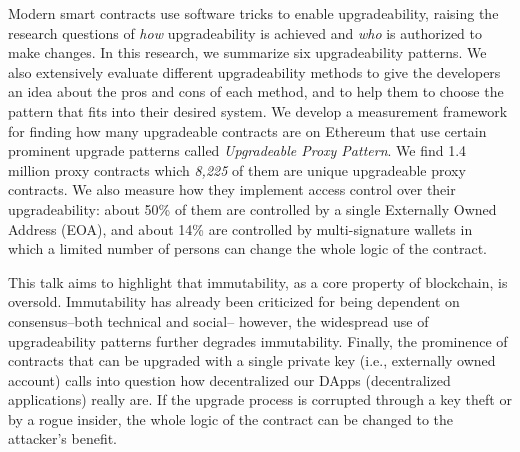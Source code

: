 \documentclass[a4paper]{article}
\begin{document}
Modern smart contracts use software tricks to enable upgradeability, raising the research questions of \textit{how} upgradeability is achieved and \textit{who} is authorized to make changes. In this research, we summarize six upgradeability patterns. We also extensively evaluate different upgradeability methods to give the developers an idea about the pros and cons of each method, and to help them to choose the pattern that fits into their desired system. 
We develop a measurement framework for finding how many upgradeable contracts are on Ethereum that use certain prominent upgrade patterns called \textit{Upgradeable Proxy Pattern}. We find 1.4 million proxy contracts which \textit{8,225} of them are unique upgradeable proxy contracts. We also measure how they implement access control over their upgradeability: about 50\% of them are controlled by a single Externally Owned Address (EOA), and about 14\% are controlled by multi-signature wallets in which a limited number of persons can change the whole logic of the contract.


This talk aims to highlight that immutability, as a core property of blockchain, is oversold. Immutability has already been criticized for being dependent on consensus--both technical and
social-- however, the widespread use of upgradeability patterns further degrades immutability. Finally, the prominence of contracts that can be upgraded with a single private key (i.e., externally owned account) calls into question how decentralized our DApps (decentralized applications) really are. If the upgrade process is corrupted through a key theft or by a rogue insider, the whole logic of the contract can be changed to the attacker's benefit.
\end{document}
